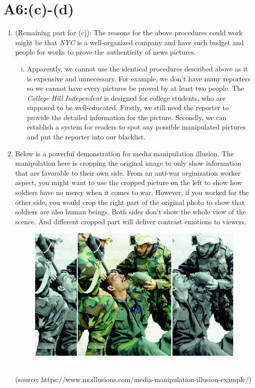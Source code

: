 \section*{A6:(c)-(d)}
\begin{enumerate}[label=\alph*., start=3]
\item (Remaining part for (c)): The reasons for the above procedures could work might be that \emph{NYC} is a well-organized company and have such budget and people for works to prove the authenticity of news pictures.
\begin{enumerate}[(i)]
    \item Apparently, we cannot use the identical procedures described above as it is expensive and unnecessary. For example, we don't have many reporters so we cannot have every pictures be proved by at least two people. The \emph{College Hill Independent} is designed for college students, who are supposed to be well-educated. Firstly, we still need the reporter to provide the detailed information for the picture. Secondly, we can establish a system for readers to spot any possible manipulated pictures and put the reporter into our blacklist. 
\end{enumerate}

\item Below is a powerful demonstration for media manipulation illusion. The manipulation here is cropping the original image to only show information that are favorable to their own side. From an anti-war orginization worker aspect, you might want to use the cropped picture on the left to show how soldiers have no mercy when it comes to war. However, if you worked for the other side, you would crop the right part of the original photo to show that soldiers are also human beings. Both sides don't show the whole view of the scence. And different cropped part will deliver contrast emotions to viewers.
\begin{figure}[htbp]
    \centering
    \includegraphics[scale=1.0]{A6_d.jpg}
\end{figure}
\\ (source: https://www.moillusions.com/media-manipulation-illusion-example/)
\end{enumerate}

